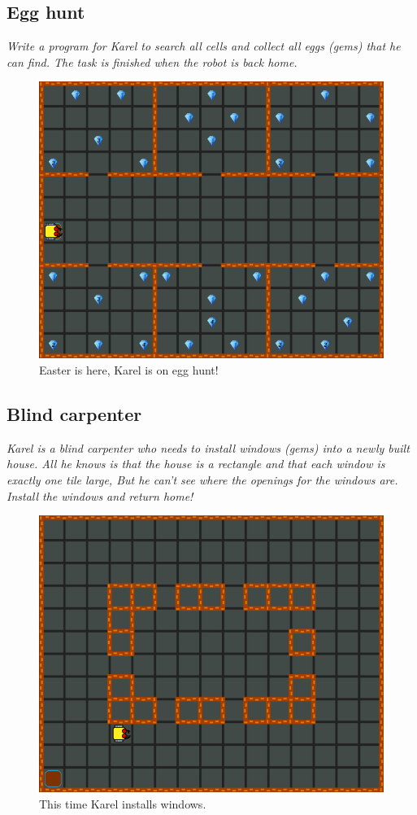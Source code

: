 {{\subsection{Egg hunt}

{\em Write a program for Karel to search all cells and collect all eggs (gems) that he can find. The task is finished when the robot is back home.}


\begin{figure}[!ht]
\begin{center}
\includegraphics[height=0.4\textwidth]{img/f03.png}
\end{center}
\vspace{-4mm}
\caption{Easter is here, Karel is on egg hunt!}
\vspace{-1cm}
\label{fig:f03}
\end{figure}
\newpage


\subsection{Blind carpenter}

{\em Karel is a blind carpenter who needs to install windows (gems) into a newly built house. All he knows is that the house is a rectangle and that each window is exactly one tile large, But he can't see where the openings for the windows are. Install the windows and return home!}


\begin{figure}[!ht]
\begin{center}
\includegraphics[height=0.4\textwidth]{img/f04.png}
\end{center}
\vspace{-4mm}
\caption{This time Karel installs windows.}
\label{fig:f04}
\end{figure}
\vspace{-1cm}



}}
